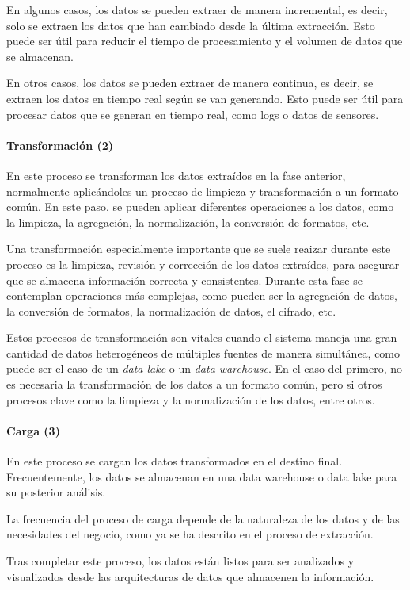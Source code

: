 En algunos casos, los datos se pueden extraer de manera incremental, es decir, solo se extraen los
datos que han cambiado desde la última extracción. Esto puede ser útil para reducir el tiempo de
procesamiento y el volumen de datos que se almacenan.

En otros casos, los datos se pueden extraer de manera continua, es decir, se extraen los datos en
tiempo real según se van generando. Esto puede ser útil para procesar datos que se generan en tiempo
real, como logs o datos de sensores.

\newpage{}
\paragraph{Transformación (2)}
En este proceso se transforman los datos extraídos en la fase anterior, normalmente aplicándoles
un proceso de limpieza y transformación a un formato común. En este paso, se pueden aplicar
diferentes operaciones a los datos, como la limpieza, la agregación, la normalización, la conversión
de formatos, etc.

Una transformación especialmente importante que se suele reaizar durante este proceso es la limpieza,
revisión y corrección de los datos extraídos, para asegurar que se almacena información correcta y
consistentes. Durante esta fase se contemplan operaciones más complejas, como pueden ser la agregación
de datos, la conversión de formatos, la normalización de datos, el cifrado, etc.

Estos procesos de transformación son vitales cuando el sistema maneja una gran cantidad de datos heterogéneos
de múltiples fuentes de manera simultánea, como puede ser el caso de un \textit{data lake} o un \textit{data
warehouse}. En el caso del primero, no es necesaria la transformación de los datos a un formato común, pero si
otros procesos clave como la limpieza y la normalización de los datos, entre otros.

\paragraph{Carga (3)}
En este proceso se cargan los datos transformados en el destino final. Frecuentemente, los datos se
almacenan en una data warehouse o data lake para su posterior análisis.

La frecuencia del proceso de carga depende de la naturaleza de los datos y de las necesidades del
negocio, como ya se ha descrito en el proceso de extracción.

Tras completar este proceso, los datos están listos para ser analizados y visualizados desde las arquitecturas
de datos que almacenen la información.

